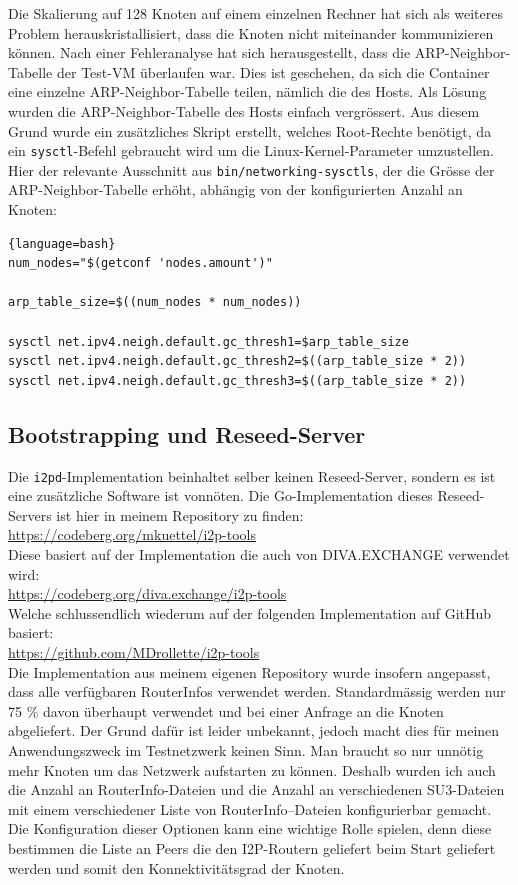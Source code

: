 Die Skalierung auf 128 Knoten auf einem einzelnen Rechner hat sich als weiteres Problem herauskristallisiert,
dass die Knoten nicht miteinander kommunizieren können.
Nach einer Fehleranalyse hat sich herausgestellt, dass die ARP-Neighbor-Tabelle der
Test-VM überlaufen war.
Dies ist geschehen, da sich die Container eine einzelne ARP-Neighbor-Tabelle teilen, nämlich die des Hosts.
Als Lösung wurden die ARP-Neighbor-Tabelle des Hosts einfach vergrössert.
Aus diesem Grund wurde ein zusätzliches Skript erstellt, welches Root-Rechte benötigt, da ein \lstinline|sysctl|-Befehl gebraucht wird um die Linux-Kernel-Parameter umzustellen.
Hier der relevante Ausschnitt aus \lstinline|bin/networking-sysctls|, der die Grösse der ARP-Neighbor-Tabelle erhöht, abhängig von der konfigurierten Anzahl an Knoten:
\begin{lstlisting}[firstnumber=9]{language=bash}
num_nodes="$(getconf 'nodes.amount')"

arp_table_size=$((num_nodes * num_nodes))

sysctl net.ipv4.neigh.default.gc_thresh1=$arp_table_size
sysctl net.ipv4.neigh.default.gc_thresh2=$((arp_table_size * 2))
sysctl net.ipv4.neigh.default.gc_thresh3=$((arp_table_size * 2))
\end{lstlisting}

\subsection{Bootstrapping und Reseed-Server}\label{sec:umsetzung_bootstrap}

Die \lstinline|i2pd|-Implementation beinhaltet selber keinen Reseed-Server, sondern es ist eine zusätzliche Software ist vonnöten.  
Die Go-Implementation dieses Reseed-Servers ist hier in meinem Repository zu finden:\\ \url{https://codeberg.org/mkuettel/i2p-tools}\\
Diese basiert auf der Implementation die auch von DIVA.EXCHANGE verwendet wird:\\ \url{https://codeberg.org/diva.exchange/i2p-tools}\\
Welche schlussendlich wiederum auf der folgenden Implementation auf GitHub basiert:\\  \url{https://github.com/MDrollette/i2p-tools}\\

Die Implementation aus meinem eigenen Repository wurde insofern angepasst,
dass alle verfügbaren RouterInfos verwendet werden. Standardmässig werden nur 75 \% davon überhaupt verwendet und bei einer Anfrage an die Knoten abgeliefert.
Der Grund dafür ist leider unbekannt, jedoch macht dies für meinen Anwendungszweck im Testnetzwerk keinen Sinn. 
Man braucht so nur unnötig mehr Knoten um das Netzwerk aufstarten zu können.
Deshalb wurden ich auch die Anzahl an RouterInfo-Dateien und die Anzahl an verschiedenen SU3-Dateien mit einem verschiedener Liste von RouterInfo--Dateien konfigurierbar gemacht.
Die Konfiguration dieser Optionen kann eine wichtige Rolle spielen, denn diese bestimmen  die Liste an Peers die den I2P-Routern geliefert beim Start geliefert werden und somit den Konnektivitätsgrad der Knoten.

